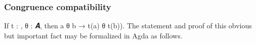 \subsubsection{Congruence compatibility}\label{congruence-compatibility}
If \ab t \as : , \ab θ \as :  \ab 𝑨, then \ab a \ab θ \ab b \as → \ab t(\ab a) \ab θ \ab t(\ab b)). The statement and proof of this obvious but important fact may be formalized in Agda as follows.
\ccpad
\begin{code}%
\>[0]%
\>[452I]\AgdaSymbol{:}%
\>[453I]\AgdaSymbol{\{}\AgdaSpace{}%
\AgdaSymbol{:}\AgdaSpace{}%
\AgdaSymbol{\}\{}\AgdaSpace{}%
\AgdaSymbol{:}\AgdaSpace{}%
\AgdaSpace{}%
\AgdaSymbol{\}}\<%
\\
\>[.][@{}l@{}]\<[453I]%
\>[18]\AgdaSymbol{(}\AgdaSpace{}%
\AgdaSymbol{:}\AgdaSpace{}%
\AgdaSpace{}%
\AgdaSpace{}%
\AgdaSymbol{)(}\AgdaSpace{}%
\AgdaSymbol{:}\AgdaSpace{}%
\AgdaSymbol{\{}\AgdaSymbol{\}\{}\AgdaSymbol{\})(}\AgdaSpace{}%
\AgdaSymbol{:}\AgdaSpace{}%
\AgdaSpace{}%
\AgdaSymbol{)}\<%
\\
\>[452I][@{}l@{\AgdaIndent{0}}]%
\>[17]\AgdaComment{------------------------------------------------}\<%
\\
\>[0][@{}l@{\AgdaIndent{0}}]%
\>[1]%
\>[18]\AgdaSpace{}%
\AgdaSymbol{(}\AgdaSpace{}%
\AgdaSpace{}%
\AgdaSymbol{)}\AgdaSpace{}%
\AgdaSpace{}%
\AgdaSpace{}%
\<%
\\
%
\\[\AgdaEmptyExtraSkip]%
\>[0]\AgdaSpace{}%
\AgdaSpace{}%
\AgdaSymbol{(}\AgdaSpace{}%
\AgdaSymbol{)}\AgdaSpace{}%
\AgdaSpace{}%
\AgdaSpace{}%
\AgdaSymbol{=}\AgdaSpace{}%
\AgdaSpace{}%
\<%
\\
%
\\[\AgdaEmptyExtraSkip]%
\>[0]\AgdaSpace{}%
\AgdaSpace{}%
\AgdaSymbol{(}\AgdaSpace{}%
\AgdaSpace{}%
\AgdaSymbol{)}\AgdaSpace{}%
\AgdaSpace{}%

\end{code}
